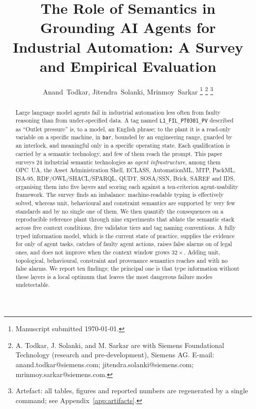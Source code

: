 \documentclass[10pt,journal,letterpaper]{IEEEtran}
\newcommand{\opcua}{OPC~UA}
\begin{document}
\title{The Role of Semantics in Grounding AI Agents for Industrial
Automation: A Survey and Empirical Evaluation}

\author{Anand~Todkar, Jitendra~Solanki, Mrinmoy~Sarkar%
\thanks{Manuscript submitted \today.}%
\thanks{A. Todkar, J. Solanki, and M. Sarkar are with Siemens Foundational Technology (research and pre-development), Siemens AG.
E-mail: anand.todkar@siemens.com; jitendra.solanki@siemens.com; mrinmoy.sarkar@siemens.com.}%
\thanks{Artefact: all tables, figures and reported numbers are regenerated by a
single command; see Appendix~\ref{app:artifacts}.}}
\maketitle

\begin{abstract}
Large language model agents fail in industrial automation less often from faulty
reasoning than from under-specified data. A tag named \texttt{L1\_FIL\_PT0301\_PV}
described as ``Outlet pressure'' is, to a model, an English phrase; to the plant
it is a read-only variable on a specific machine, in \texttt{bar}, bounded by an
engineering range, guarded by an interlock, and meaningful only in a specific
operating state. Each qualification is carried by a semantic technology, and few
of them reach the prompt. This paper surveys 24 industrial semantic technologies
as \emph{agent infrastructure}, among them \opcua, the Asset Administration Shell,
ECLASS,
AutomationML, MTP, PackML, ISA-95, RDF/OWL/SHACL/SPARQL, QUDT, SOSA/SSN, Brick,
SAREF and IDS, organising them into five layers and scoring each against a
ten-criterion agent-usability framework. The survey finds an imbalance:
machine-readable typing is effectively solved, whereas unit, behavioural and
constraint semantics are supported by very few standards and by no single one of
them. We
then quantify the consequences on a reproducible reference plant through nine
experiments that ablate the semantic stack across five context conditions, five
validator tiers and \NSchemes{} tag naming conventions. A fully typed
information model, which is the current state of practice, supplies the evidence
for only \CeilingCTwo{} of \NTasks{} agent tasks, catches \RecallGTwo{} of
\NFaulty{} faulty agent actions, raises false alarms on \FPRGTwo{} of legal
ones, and does not improve when the context window grows $32\times$. Adding
unit, topological, behavioural, constraint and provenance semantics reaches
\CeilingCFour{} and \RecallGFour{} with no false alarms. We report ten findings;
the principal one is that type information without these layers is a local optimum
that leaves the most dangerous failure modes undetectable.
\end{abstract}
\end{document}
